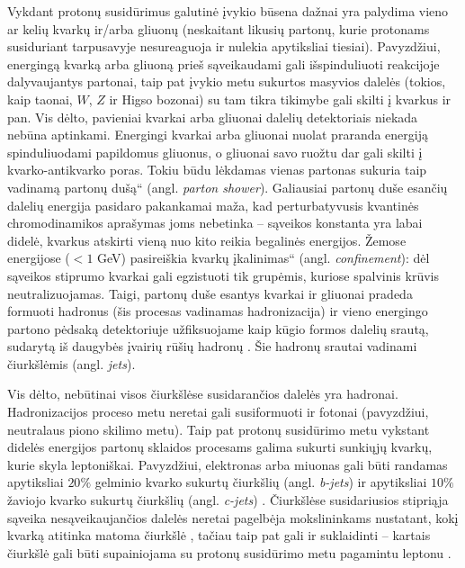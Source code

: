 \documentclass[a4paper, 12pt, oneside]{article}
\newcommand{\ltq}[1]{{\quotedblbase{}#1\textquotedblleft{}}}
\newlength\q
\begin{document}
Vykdant protonų susidūrimus galutinė įvykio būsena dažnai yra palydima vieno ar kelių kvarkų ir/arba gliuonų
(neskaitant likusių partonų, kurie protonams susiduriant tarpusavyje nesureaguoja ir nulekia apytiksliai tiesiai).
Pavyzdžiui, energingą kvarką arba gliuoną prieš sąveikaudami gali išspinduliuoti reakcijoje dalyvaujantys partonai,
taip pat įvykio metu sukurtos masyvios dalelės (tokios, kaip taonai, $W$, $Z$ ir Higso bozonai) su tam tikra
tikimybe gali skilti į kvarkus ir pan.
Vis dėlto, pavieniai kvarkai arba gliuonai dalelių detektoriais niekada nebūna aptinkami.
Energingi kvarkai arba gliuonai nuolat praranda energiją spinduliuodami papildomus gliuonus, o gliuonai savo ruožtu
dar gali skilti į kvarko-antikvarko poras.
Tokiu būdu lėkdamas vienas partonas sukuria taip vadinamą \ltq{partonų dušą} (angl. \textit{parton shower}).
Galiausiai partonų duše esančių dalelių energija pasidaro pakankamai maža, kad perturbatyvusis kvantinės chromodinamikos
aprašymas joms nebetinka -- sąveikos konstanta yra labai didelė, kvarkus atskirti vieną nuo kito reikia begalinės energijos.
Žemose energijose ($<1$ GeV) pasireiškia kvarkų \ltq{įkalinimas} (angl. \textit{confinement}): dėl sąveikos stiprumo
kvarkai gali egzistuoti tik grupėmis, kuriose spalvinis krūvis neutralizuojamas.
Taigi, partonų duše esantys kvarkai ir gliuonai pradeda formuoti hadronus (šis procesas vadinamas hadronizacija)
ir vieno energingo partono pėdsaką detektoriuje užfiksuojame kaip kūgio formos dalelių srautą, sudarytą iš daugybės
įvairių rūšių hadronų \cite{Jets}.
Šie hadronų srautai vadinami čiurkšlėmis (angl. \textit{jets}).

Vis dėlto, nebūtinai visos čiurkšlėse susidarančios dalelės yra hadronai.
Hadronizacijos proceso metu neretai gali susiformuoti ir fotonai (pavyzdžiui, neutralaus piono skilimo metu).
Taip pat protonų susidūrimo metu vykstant didelės energijos partonų sklaidos procesams galima sukurti sunkiųjų kvarkų,
kurie skyla leptoniškai.
Pavyzdžiui, elektronas arba miuonas gali būti randamas apytiksliai $20\%$ gelminio kvarko sukurtų čiurkšlių
(angl. \textit{b-jets}) ir apytiksliai $10\%$ žaviojo kvarko sukurtų čiurkšlių (angl. \textit{c-jets}) \cite{LeptonJets}.
Čiurkšlėse susidariusios stipriąja sąveika nesąveikaujančios dalelės neretai pagelbėja mokslininkams nustatant,
kokį kvarką atitinka matoma čiurkšlė \cite{LeptonJets}, tačiau taip pat gali ir suklaidinti -- kartais čiurkšlė gali
būti supainiojama su protonų susidūrimo metu pagamintu leptonu \cite{DY2013, DY7TeVatlas, DY2015, DY8TeVatlas, DY2019, EleID, MuonID}.
\end{document}

